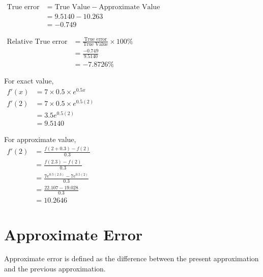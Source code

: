 \begin{minipage}[T]{0.45\textwidth}
   $\begin{aligned}
      \text{True error}
      & = \text{True Value} - \text{Approximate Value} \\
      & = 9.5140 - 10.263 \\
      & = -0.749
   \end{aligned}$

   \vspace{2ex}
   $\begin{aligned}
      \text{Relative True error}
      & = \frac{\text{True error}}{\text{True Value}}\times 100\% \\
      & = \frac{-0.749}{9.5140} \\
      & = -7.8726\%
   \end{aligned}$
\end{minipage}\vrule\hfill
\begin{minipage}[T]{0.25\textwidth}
   For exact value,\\

   $\begin{aligned}
      f'(x) & = 7 \times 0.5 \times e^{0.5x} \\
      f'(2) & = 7 \times 0.5 \times e^{0.5(2)} \\
      & = 3.5e^{0.5(2)} \\
      & = 9.5140
   \end{aligned}$
\end{minipage}
\begin{minipage}[T]{0.25\textwidth}
   For approximate value,\\

   $\begin{aligned}
      f'(2) & = \frac{f(2+0.3) - f(2)}{0.3} \\
      & = \frac{f(2.3) - f(2)}{0.3} \\
      & = \frac{7e^{0.5(2.3)} - 7e^{0.5(2)}}{0.3} \\
      & = \frac{22.107 - 19.028}{0.3} \\
      & = 10.2646
   \end{aligned}$
\end{minipage}


\section{Approximate Error}
Approximate error is defined as the difference between the
present approximation and the previous approximation.

